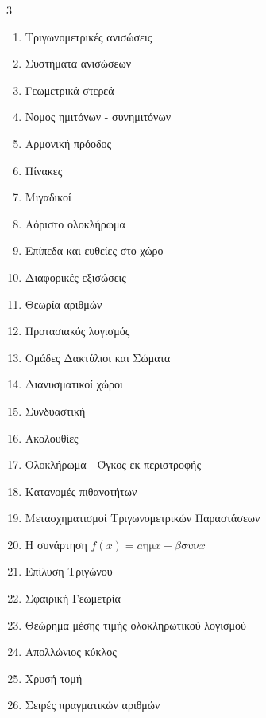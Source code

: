 \documentclass[twoside,nofonts,internet]{askhseis}
\newcommand{\hm}[1]{\textrm{ημ}#1}
\newcommand{\syn}[1]{\textrm{συν}#1}
\begin{document}
\begin{multicols}{3}
\begin{enumerate}
\item Τριγωνομετρικές ανισώσεις
\item Συστήματα ανισώσεων
\item Γεωμετρικά στερεά
\item Νομος ημιτόνων - συνημιτόνων
\item Αρμονική πρόοδος
\item Πίνακες
\item Μιγαδικοί
\item Αόριστο ολοκλήρωμα
\item Επίπεδα και ευθείες στο χώρο
\item Διαφορικές εξισώσεις
\item Θεωρία αριθμών
\item Προτασιακός λογισμός
\item Ομάδες Δακτύλιοι και Σώματα
\item Διανυσματικοί χώροι
\item Συνδυαστική
\item Ακολουθίες
\item Ολοκλήρωμα - Όγκος εκ περιστροφής
\item Κατανομές πιθανοτήτων
\item Μετασχηματισμοί Τριγωνομετρικών Παραστάσεων
\item Η συνάρτηση $ f(x)=a\hm{x}+\beta\syn{x} $
\item Επίλυση Τριγώνου
\item Σφαιρική Γεωμετρία
\item Θεώρημα μέσης τιμής ολοκληρωτικού λογισμού
\item Απολλώνιος κύκλος
\item Χρυσή τομή
\item Σειρές πραγματικών αριθμών
\end{enumerate}
\end{multicols}
\end{document}
